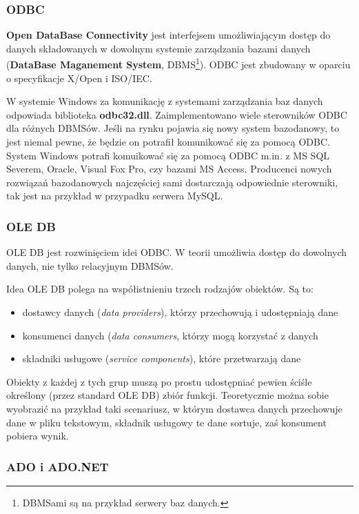 \subsubsection{ODBC}

{\bf Open DataBase Connectivity } jest interfejsem umożliwiającym dostęp do danych składowanych w 
dowolnym systemie zarządzania bazami danych ({\bf DataBase Maganement System}, 
DBMS\footnote{DBMSami są na przykład serwery baz danych.}). ODBC jest zbudowany w oparciu o specyfikacje
X/Open i ISO/IEC. 

W systemie Windows za komunikację z systemami zarządzania baz danych odpowiada biblioteka
{\bf odbc32.dll}. Zaimplementowano wiele sterowników ODBC dla różnych DBMSów. Jeśli na rynku
pojawia się nowy system bazodanowy, to jest niemal pewne, że będzie on potrafił 
komunikować się za pomocą ODBC. System Windows potrafi komuikować się za pomocą ODBC m.in. z MS SQL Severem,
Oracle, Visual Fox Pro, czy bazami MS Access. Producenci nowych rozwiązań bazodanowych najczęściej
sami dostarczają odpowiednie sterowniki, tak jest na przykład w przypadku serwera MySQL.

\subsubsection{OLE DB}

OLE DB jest rozwinięciem idei ODBC. 
W teorii umożliwia dostęp do dowolnych danych, nie tylko relacyjnym DBMSów. 

Idea OLE DB polega na współistnieniu trzech rodzajów obiektów. Są to:
\begin{itemize}
\item dostawcy danych ({\em data providers}), którzy przechowują i udostępniają dane
\item konsumenci danych ({\em data consumers}, którzy mogą korzystać z danych
\item składniki usługowe ({\em service components}), które przetwarzają dane
\end{itemize}

Obiekty z każdej z tych grup muszą po prostu udostępniać pewien ściśle określony (przez standard OLE DB)
zbiór funkcji. Teoretycznie można sobie wyobrazić na przykład taki scenariusz, w którym dostawca danych
przechowuje dane w pliku tekstowym, składnik usługowy te dane sortuje, zaś konsument pobiera wynik.

\subsubsection{ADO i ADO.NET}

